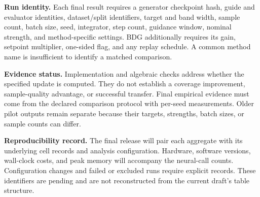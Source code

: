 \documentclass{article}
\begin{document}
\textbf{Run identity.} Each final result requires a generator checkpoint hash,
guide and evaluator identities, dataset/split identifiers, target and band width,
sample count, batch size, seed, integrator, step count, guidance window, nominal
strength, and method-specific settings. BDG additionally requires its gain,
setpoint multiplier, one-sided flag, and any replay schedule. A common method
name is insufficient to identify a matched comparison.

\textbf{Evidence status.} Implementation and algebraic checks address whether the
specified update is computed. They do not establish a coverage improvement,
sample-quality advantage, or successful transfer. Final empirical evidence must
come from the declared comparison protocol with per-seed measurements. Older
pilot outputs remain separate because their targets, strengths, batch sizes, or
sample counts can differ.

\textbf{Reproducibility record.} The final release will pair each aggregate with
its underlying cell records and analysis configuration. Hardware, software
versions, wall-clock costs, and peak memory will accompany the neural-call
counts. Configuration changes and failed or excluded runs require explicit
records. These identifiers are pending and are not reconstructed from the
current draft's table structure.
\end{document}
